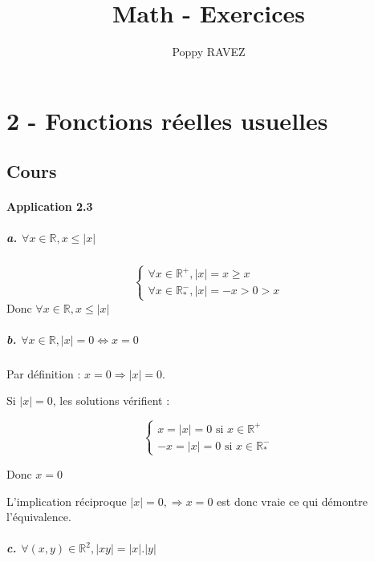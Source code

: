 \documentclass[a4paper,10pt]{report}
\title{Math - Exercices}
\author{Poppy RAVEZ}
\begin{document}
%


\part*{2 - Fonctions réelles usuelles}

\chapter*{Cours}

\subsection*{Application 2.3}

\subsubsection*{a. $\forall x \in \mathbb{R}, x \leq |x|$}

\begin{displaymath}
	\begin{cases}
		\forall x \in \mathbb{R}^{+}, |x| = x \geq x \\
		\forall x \in \mathbb{R}^{-}_{*}, |x| = -x > 0 > x
	\end{cases}
\end{displaymath}
Donc $\forall x \in \mathbb{R}, x \leq |x|$

\subsubsection*{b. $\forall x \in \mathbb{R}, |x| = 0 \Longleftrightarrow x = 0$}

Par définition : $x = 0 \Longrightarrow |x| = 0$.

Si $|x| = 0$, les solutions  vérifient :

\begin{displaymath}
	\begin{cases}
		x = |x| = 0 \text{ si } x \in \mathbb{R}^{+}\\
		-x = |x| = 0 \text{ si } x \in \mathbb{R}^{-}_{*}
	\end{cases}
\end{displaymath}

Donc $x=0$

L'implication réciproque $|x|=0, \Longrightarrow x=0$ est donc vraie ce qui démontre l'équivalence.

\subsubsection*{c. $\forall (x,y) \in \mathbb{R}^2, |xy| = |x|.|y|$}
\end{document}
